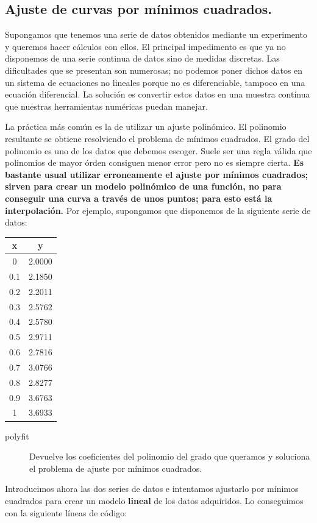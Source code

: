 \subsection{Ajuste de curvas por mínimos cuadrados.}

Supongamos que tenemos una serie de datos obtenidos mediante un
experimento y queremos hacer cálculos con ellos. El principal
impedimento es que ya no disponemos de una serie continua de datos
sino de medidas discretas.  Las dificultades que se presentan son
numerosas; no podemos poner dichos datos en un sistema de ecuaciones
no lineales porque no es diferenciable, tampoco en una ecuación
diferencial. La solución es convertir estos datos en una muestra
contínua que nuestras herramientas numéricas puedan manejar.

La práctica más común es la de utilizar un ajuste polinómico. El
polinomio resultante se obtiene resolviendo el problema de mínimos
cuadrados.  El grado del polinomio es uno de los datos que debemos
escoger. Suele ser una regla válida que polinomios de mayor órden
consiguen menor error pero no es siempre cierta. \textbf{Es bastante
  usual utilizar erroneamente el ajuste por mínimos cuadrados; sirven
  para crear un modelo polinómico de una función, no para conseguir
  una curva a través de unos puntos; para esto está la interpolación.}
Por ejemplo, supongamos que disponemos de la siguiente serie de datos:

\begin{center}\begin{tabular}{|c|c|}
    \hline 
    x&
    y\tabularnewline
    \hline
    \hline 
    0&
    2.0000\tabularnewline
    \hline 
    0.1&
    2.1850\tabularnewline
    \hline 
    0.2&
    2.2011\tabularnewline
    \hline 
    0.3&
    2.5762\tabularnewline
    \hline 
    0.4&
    2.5780\tabularnewline
    \hline 
    0.5&
    2.9711\tabularnewline
    \hline 
    0.6&
    2.7816\tabularnewline
    \hline 
    0.7&
    3.0766\tabularnewline
    \hline 
    0.8&
    2.8277\tabularnewline
    \hline 
    0.9&
    3.6763\tabularnewline
    \hline 
    1&
    3.6933\tabularnewline
    \hline
  \end{tabular}\end{center}

\begin{description}
\item [polyfit\texttt{}]Devuelve los coeficientes del
  polinomio del grado que queramos y soluciona el problema de ajuste
  por mínimos cuadrados.
\end{description}
Introducimos ahora las dos series de datos e intentamos ajustarlo por
mínimos cuadrados para crear un modelo \textbf{lineal} de los datos
adquiridos. Lo conseguimos con la siguiente líneas de código:


